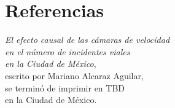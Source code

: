\documentclass[11pt, oneside]{book}
\begin{document}











\appendix





\chapter*{Referencias}



\clearpage
\thispagestyle{empty}
\vspace*{\fill}
\begin{center}
    \small
    \textit{El efecto causal de las cámaras de velocidad\\
    en el número de incidentes viales\\
    en la Ciudad de México},\\
    escrito por Mariano Alcaraz Aguilar,\\
    se terminó de imprimir en TBD\\
    en la Ciudad de México.
\end{center}
\vspace*{\fill}


\end{document}

